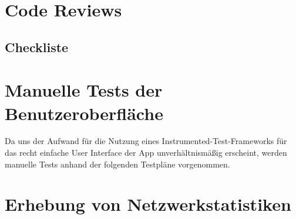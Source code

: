 



\clearpage


\section{Code Reviews}


\subsection{Checkliste}





\clearpage

\section{Manuelle Tests der Benutzeroberfläche}

Da uns der Aufwand für die Nutzung eines Instrumented-Test-Frameworks
für das recht einfache User Interface der App unverhältnismäßig
erscheint, werden manuelle Tests anhand der folgenden Testpläne
vorgenommen.



\clearpage
\section{Erhebung von Netzwerkstatistiken}

